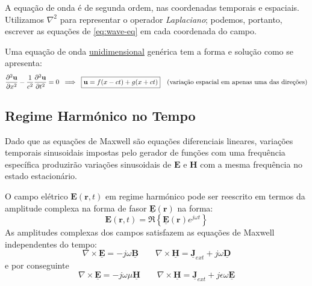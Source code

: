 \vspace{-0.75em}
\begin{warning}
    A equação de onda é de segunda ordem, nas coordenadas temporais e espaciais. Utilizamos $\nabla^2$ para representar o operador \emph{Laplaciano}; podemos, portanto, escrever as equações de \eqref{eq:wave-eq} em cada coordenada do campo.
\end{warning}

Uma equação de onda \underline{unidimensional} genérica tem a forma e solução como se apresenta:
$$
    \frac{\partial^2 \mathbf{u}}{\partial x^2} - \frac{1}{c^2} \frac{\partial^2 \mathbf{u}}{\partial t^2} = 0
    \;\implies\;
    \boxed{%
        \mathbf{u} = f(x - ct) + g(x + ct)
    }
    \quad \text{(variação espacial em apenas uma das direções)}
$$

\subsection{Regime Harmónico no Tempo}

Dado que as equações de Maxwell são equações diferenciais lineares, variações temporais sinusoidais impostas pelo gerador de funções com uma frequência específica produzirão variações sinusoidais de $\mathbf{E}$ e $\mathbf{H}$ com a mesma frequência no estado estacionário.

O campo elétrico $\mathbf{E}(\mathbf{r}, t) $ em regime harmónico pode ser reescrito em termos da amplitude complexa na forma de fasor $\underline{\mathbf{E}}(\mathbf{r})$ na forma:
\begin{equation}
    \mathbf{E}(\mathbf{r}, t) = \Re\left\{\underline{\mathbf{E}}(\mathbf{r}) e^{j\omega t}\right\}
\end{equation}
As amplitudes complexas dos campos satisfazem as equações de Maxwell independentes do tempo:
\begin{equation}
    \nabla\times\underline{\mathbf{E}} = -j\omega\underline{\mathbf{B}}\qquad
     \nabla\times\underline{\mathbf{H}} = \underline{\mathbf{J}}_{ext} + j\omega\underline{\mathbf{D}}
\end{equation}
e por conseguinte
\begin{equation}\label{eq:time-independent-max}
    \boxed{\nabla\times\underline{\mathbf{E}} = -j\omega\mu\underline{\mathbf{H}}\qquad
     \nabla\times\underline{\mathbf{H}} = \underline{\mathbf{J}}_{ext} + j\epsilon\omega\underline{\mathbf{E}}}
\end{equation}

